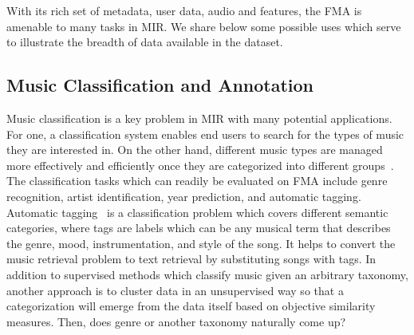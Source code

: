 \documentclass{article}
\begin{document}
With its rich set of metadata, user data, audio and features, the FMA is amenable to many tasks in MIR. We share below some possible uses which serve to illustrate the breadth of data available in the dataset.




\subsection{Music Classification and Annotation}

Music classification is a key problem in MIR with many potential applications. For one, a classification system enables end users to search for the types of music they are interested in. On the other hand, different music types are managed more effectively and efficiently once they are categorized into different groups~\cite{mir_review_classif}.
The classification tasks which can readily be evaluated on FMA include genre recognition, artist identification, year prediction, and automatic tagging.
Automatic tagging~\cite{autotagging} is a classification problem which covers different semantic categories, where tags are labels which can be any musical term that describes the genre, mood, instrumentation, and style of the song.
It helps to convert the music retrieval problem to text retrieval by substituting songs with tags.
In addition to supervised methods which classify music given an arbitrary taxonomy, another approach is to cluster data in an unsupervised way so that a categorization will emerge from the data itself based on objective similarity measures. Then, does genre or another taxonomy naturally come up?
\end{document}
